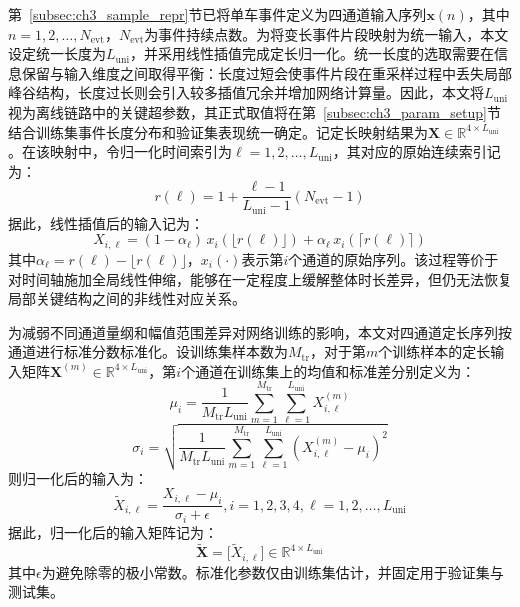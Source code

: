 \documentclass{xdupgthesis}
\begin{document}
第~\ref{subsec:ch3_sample_repr}节已将单车事件定义为四通道输入序列$\mathbf{x}(n)$，其中$n=1,2,\ldots,N_{\mathrm{evt}}$，$N_{\mathrm{evt}}$为事件持续点数。为将变长事件片段映射为统一输入，本文设定统一长度为$L_{\mathrm{uni}}$，并采用线性插值完成定长归一化。统一长度的选取需要在信息保留与输入维度之间取得平衡：长度过短会使事件片段在重采样过程中丢失局部峰谷结构，长度过长则会引入较多插值冗余并增加网络计算量。因此，本文将$L_{\mathrm{uni}}$视为离线链路中的关键超参数，其正式取值将在第~\ref{subsec:ch3_param_setup}节结合训练集事件长度分布和验证集表现统一确定。记定长映射结果为$\mathbf{X}\in\mathbb{R}^{4\times L_{\mathrm{uni}}}$。在该映射中，令归一化时间索引为$\ell=1,2,\ldots,L_{\mathrm{uni}}$，其对应的原始连续索引记为：
\begin{equation}
    r(\ell)=1+\frac{\ell-1}{L_{\mathrm{uni}}-1}(N_{\mathrm{evt}}-1)
\end{equation}
据此，线性插值后的输入记为：
\begin{equation}
    X_{i,\ell}=(1-\alpha_\ell)\,x_i(\lfloor r(\ell)\rfloor)+\alpha_\ell\,x_i(\lceil r(\ell)\rceil)
\end{equation}
其中$\alpha_\ell=r(\ell)-\lfloor r(\ell)\rfloor$，$x_i(\cdot)$表示第$i$个通道的原始序列。该过程等价于对时间轴施加全局线性伸缩，能够在一定程度上缓解整体时长差异，但仍无法恢复局部关键结构之间的非线性对应关系。

为减弱不同通道量纲和幅值范围差异对网络训练的影响，本文对四通道定长序列按通道进行标准分数标准化。设训练集样本数为$M_{\mathrm{tr}}$，对于第$m$个训练样本的定长输入矩阵$\mathbf{X}^{(m)}\in\mathbb{R}^{4\times L_{\mathrm{uni}}}$，第$i$个通道在训练集上的均值和标准差分别定义为：
\begin{equation}
    \mu_i=\frac{1}{M_{\mathrm{tr}}L_{\mathrm{uni}}}
    \sum_{m=1}^{M_{\mathrm{tr}}}\sum_{\ell=1}^{L_{\mathrm{uni}}}X_{i,\ell}^{(m)}
\end{equation}
\begin{equation}
    \sigma_i=
    \sqrt{
    \frac{1}{M_{\mathrm{tr}}L_{\mathrm{uni}}}
    \sum_{m=1}^{M_{\mathrm{tr}}}\sum_{\ell=1}^{L_{\mathrm{uni}}}
    \left(X_{i,\ell}^{(m)}-\mu_i\right)^2}
\end{equation}
则归一化后的输入为：
\begin{equation}
    \tilde{X}_{i,\ell}=\frac{X_{i,\ell}-\mu_i}{\sigma_i+\epsilon}, i=1,2,3,4, \ell=1,2,\ldots,L_{\mathrm{uni}}
\end{equation}
据此，归一化后的输入矩阵记为：
\begin{equation}
    \tilde{\mathbf{X}}=\big[\tilde{X}_{i,\ell}\big]\in\mathbb{R}^{4\times L_{\mathrm{uni}}}
\end{equation}
其中$\epsilon$为避免除零的极小常数。标准化参数仅由训练集估计，并固定用于验证集与测试集。
\end{document}
